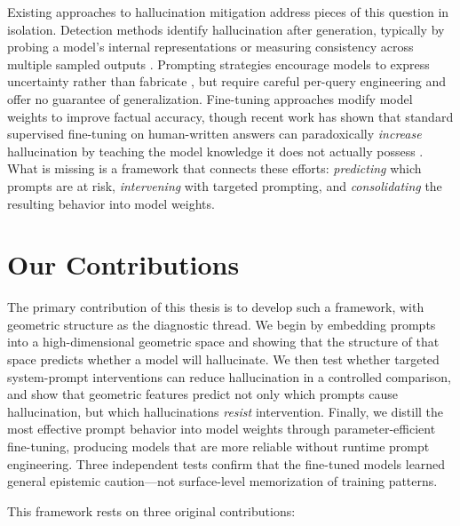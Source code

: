 Existing approaches to hallucination mitigation address pieces of this question in isolation. Detection methods identify hallucination after generation, typically by probing a model's internal representations \citep{li2024inferencetime} or measuring consistency across multiple sampled outputs \citep{manakul2023selfcheckgpt}. Prompting strategies encourage models to express uncertainty rather than fabricate \citep{dhuliawala2023chainofverification}, but require careful per-query engineering and offer no guarantee of generalization. Fine-tuning approaches modify model weights to improve factual accuracy, though recent work has shown that standard supervised fine-tuning on human-written answers can paradoxically \emph{increase} hallucination by teaching the model knowledge it does not actually possess \citep{gekhman2024does}. What is missing is a framework that connects these efforts: \emph{predicting} which prompts are at risk, \emph{intervening} with targeted prompting, and \emph{consolidating} the resulting behavior into model weights. %

\section{Our Contributions}
\label{sec:contributions}

The primary contribution of this thesis is to develop such a framework, with geometric structure as the diagnostic thread. We begin by embedding prompts into a high-dimensional geometric space and showing that the structure of that space predicts whether a model will hallucinate. We then test whether targeted system-prompt interventions can reduce hallucination in a controlled comparison, and show that geometric features predict not only which prompts cause hallucination, but which hallucinations \emph{resist} intervention. Finally, we distill the most effective prompt behavior into model weights through parameter-efficient fine-tuning, producing models that are more reliable without runtime prompt engineering. Three independent tests confirm that the fine-tuned models learned general epistemic caution---not surface-level memorization of training patterns. 

This framework rests on three original contributions:

